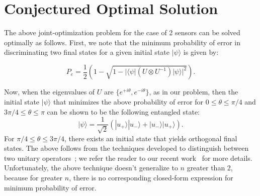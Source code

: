 \section{\bf Conjectured Optimal \iso Solution}
\label{sec:optimal}


The above joint-optimization problem for the case of 2 sensors can be solved optimally as follows. 
First, we note that the minimum probability of error in discriminating two final states for a given initial state $|\psi\rangle$  is given by: 

\begin{equation}
P_{e} = \frac{1}{2} \left( 1 - \sqrt{ 1 - |\langle \psi |(U\otimes U^{-1} ) |\psi\rangle |^{2}} \right). 
\label{eqn:two}
\end{equation}

Now, when the eigenvalues of 
$U$ are $\{e^{+i\theta}, e^{-i\theta}\}$, as in our \iso problem, then
the initial state $|\psi\rangle$ that minimizes the above
probability of error for $0 \leq \theta \leq \pi /4$ and 
$3\pi/4 \leq \theta \leq \pi$
can be shown to be the following entangled state:
 \begin{equation}
 |\psi\rangle= \frac{1}{\sqrt{2}} (|u_{+}\rangle |u_{-}\rangle + |u_{-}\rangle |u_{+}\rangle ).
 \label{eqn:two-sol}
 \end{equation}
For 
$\pi /4 \leq \theta \leq 3\pi/4$, there exists an initial state that
yields orthogonal final states. 
The above follows from the techniques developed to 
distinguish between two unitary operators~\cite{DAriano_2002};
we refer the reader to our recent work~\cite{Hillery_2023} for
more details. Unfortunately, the 
above technique doesn't generalize to $n$ greater than 2, because
for greater $n$, there is no corresponding closed-form expression for minimum
probability of error.

